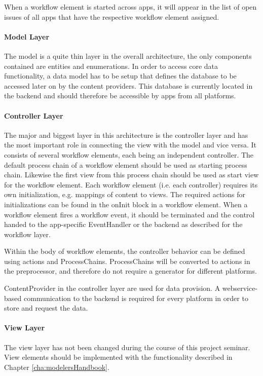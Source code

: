 When a workflow element is started across apps, it will appear in the list of open issues of all apps that have the respective workflow element assigned.

\paragraph{Model Layer}
The model is a quite thin layer in the overall architecture, the only components contained are entities and enumerations. In order to access core data functionality, a data model has to be setup that defines the database to be accessed later on by the content providers. This database is currently located in the backend and should therefore be accessible by apps from all platforms. 

\paragraph{Controller Layer}
The major and biggest layer in this architecture is the controller layer and has the most important role in connecting the view with the model and vice versa. It consists of several workflow elements, each being an independent controller. The default process chain of a workflow element should be used as starting process chain. Likewise the first view from this process chain should be used as start view for the workflow element. Each workflow element (i.e. each controller) requires its own initialization, e.g. mappings of content to views. The required actions for initializations can be found in the onInit block in a workflow element. When a workflow element fires a workflow event, it should be terminated and the control handed to the app-specific EventHandler or the backend as described for the workflow layer. 

Within the body of workflow elements, the controller behavior can be defined using actions and ProcessChains. ProcessChains will be converted to actions in the preprocessor, and therefore do not require a generator for different platforms.

ContentProvider in the controller layer are used for data provision. A webservice-based communication to the backend is required for every platform in order to store and request the data.

\paragraph{View Layer}

The view layer has not been changed during the course of this project seminar. View elements should be implemented with the functionality described in Chapter \ref{cha:modelersHandbook}. 